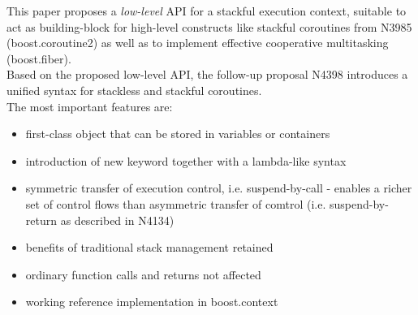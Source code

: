 This paper proposes a \emph{low-level} API for a stackful execution context, suitable
to act as building-block for high-level constructs like stackful coroutines from
N3985\cite{N3985} (boost.coroutine2\cite{bcoroutine2}) as well as to implement
effective cooperative multitasking (boost.fiber\cite{bfiber}).\\
Based on the proposed low-level API, the follow-up proposal N4398\cite{N4398}
introduces a unified syntax for stackless and stackful coroutines.\\
\newline
The most important features are:
\begin{itemize}
    \item first-class object that can be stored in variables or containers
    \item introduction of new keyword \resumable together with a lambda-like
          syntax
    \item symmetric transfer of execution control, i.e. suspend-by-call -
          enables a richer set of control flows than asymmetric transfer of
          comtrol (i.e. suspend-by-return as described in N4134)
    \item benefits of traditional stack management retained
    \item ordinary function calls and returns not affected
    \item working reference implementation in boost.context\cite{bcontext}
\end{itemize}
